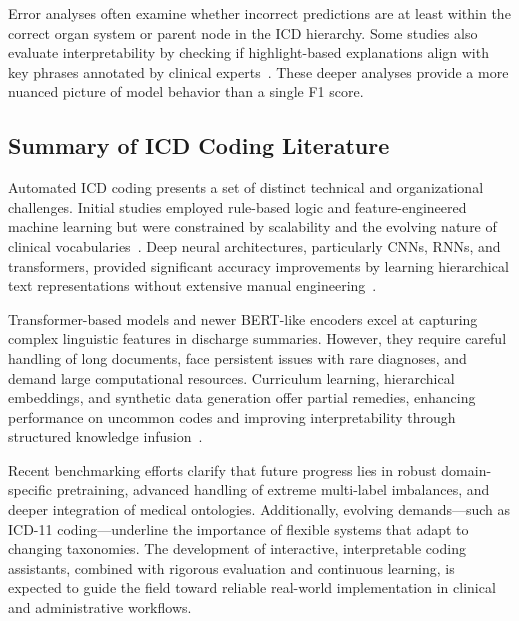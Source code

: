 Error analyses often examine whether incorrect predictions are at least within the correct organ system or parent node in the ICD hierarchy. Some studies also evaluate interpretability by checking if highlight-based explanations align with key phrases annotated by clinical experts~\citep{mullenbach2018explainable}. These deeper analyses provide a more nuanced picture of model behavior than a single F1 score.

\subsection{Summary of ICD Coding Literature}\label{sec:p1:icd-summary}

Automated ICD coding presents a set of distinct technical and organizational challenges. Initial studies employed rule-based logic and feature-engineered machine learning but were constrained by scalability and the evolving nature of clinical vocabularies~\citep{scheurwegs2017data}. Deep neural architectures, particularly CNNs, RNNs, and transformers, provided significant accuracy improvements by learning hierarchical text representations without extensive manual engineering~\citep{mullenbach2018explainable, li2020multi, heo2022medical}.

Transformer-based models and newer BERT-like encoders excel at capturing complex linguistic features in discharge summaries. However, they require careful handling of long documents, face persistent issues with rare diagnoses, and demand large computational resources. Curriculum learning, hierarchical embeddings, and synthetic data generation offer partial remedies, enhancing performance on uncommon codes and improving interpretability through structured knowledge infusion~\citep{ren2022hicu, falis2024gpt35}.

Recent benchmarking efforts clarify that future progress lies in robust domain-specific pretraining, advanced handling of extreme multi-label imbalances, and deeper integration of medical ontologies. Additionally, evolving demands---such as ICD-11 coding---underline the importance of flexible systems that adapt to changing taxonomies. The development of interactive, interpretable coding assistants, combined with rigorous evaluation and continuous learning, is expected to guide the field toward reliable real-world implementation in clinical and administrative workflows.

